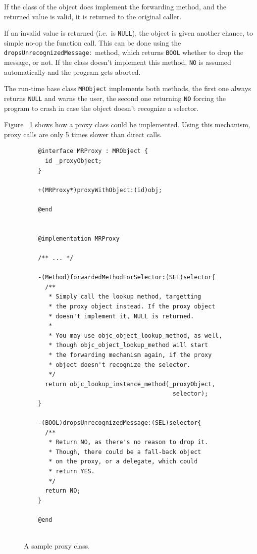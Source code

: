 If the class of the object does implement the forwarding method, and the returned value is valid, it is returned to the original caller.

If an invalid value is returned (i.e.\ is \verb=NULL=), the object is given another chance, to simple no-op the function call. This can be done using the \verb=dropsUnrecognizedMessage:= method, which returns \verb=BOOL= whether to drop the message, or not. If the class doesn't implement this method, \verb=NO= is assumed automatically and the program gets aborted.

The run-time base class \verb=MRObject= implements both methods, the first one always returns \verb=NULL= and warns the user, the second one returning \verb=NO= forcing the program to crash in case the object doesn't recognize a selector.

Figure ~\ref{fig:forwarding_proxy_class} shows how a proxy class could be implemented. Using this mechanism, proxy calls are only 5 times slower than direct calls.

\begin{figure}[htbp] 
  \begin{verbatim}
    @interface MRProxy : MRObject {
      id _proxyObject;
    }
    
    +(MRProxy*)proxyWithObject:(id)obj;
    
    @end
    
    
    @implementation MRProxy
    
    /** ... */
    
    -(Method)forwardedMethodForSelector:(SEL)selector{
      /** 
       * Simply call the lookup method, targetting
       * the proxy object instead. If the proxy object
       * doesn't implement it, NULL is returned.
       *
       * You may use objc_object_lookup_method, as well,
       * though objc_object_lookup_method will start
       * the forwarding mechanism again, if the proxy
       * object doesn't recognize the selector.
       */
      return objc_lookup_instance_method(_proxyObject, 
                                          selector);
    }
    
    -(BOOL)dropsUnrecognizedMessage:(SEL)selector{
      /** 
       * Return NO, as there's no reason to drop it.
       * Though, there could be a fall-back object 
       * on the proxy, or a delegate, which could 
       * return YES.
       */
      return NO;
    }
    
    @end
    
  \end{verbatim}
  \centering{}
  \caption{A sample proxy class.}
  \label{fig:forwarding_proxy_class}
\end{figure}

